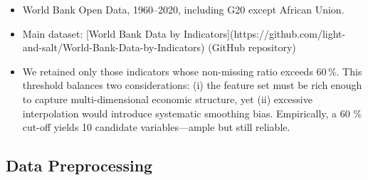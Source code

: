 \documentclass[12pt]{article}
\begin{document}
\begin{itemize}
    \item World Bank Open Data, 1960--2020, including G20 except African Union.
    \item Main dataset: [World Bank Data by Indicators](https://github.com/light-and-salt/World-Bank-Data-by-Indicators) (GitHub repository)
    \item We retained only those indicators whose non-missing ratio exceeds 60\,\%.  This threshold balances two considerations: (i) the feature set must be rich enough to capture multi-dimensional economic structure, yet (ii) excessive interpolation would introduce systematic smoothing bias.  Empirically, a 60 \% cut-off yields 10 candidate variables—ample but still reliable.
\end{itemize}

\begin{table}[H]
    \centering
    \small
    \caption{Indicator Table}
    \label{tab:indicator_table}
\end{table}

\subsection{Data Preprocessing}
\end{document}
